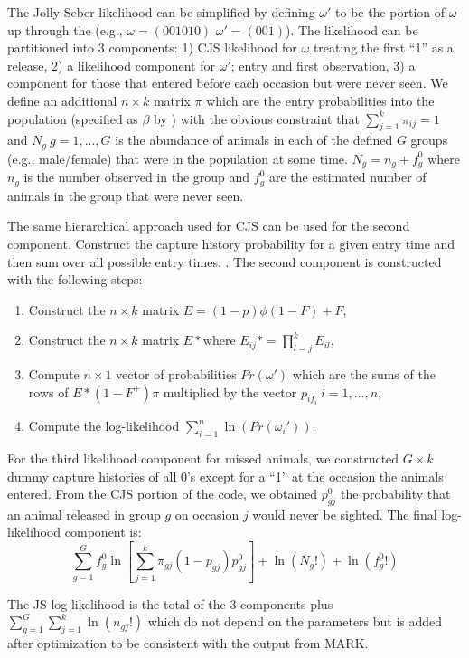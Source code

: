 \documentclass[12pt]{article}
\begin{document}
The Jolly-Seber likelihood can be simplified by defining $\omega'$
to be the portion of $\omega$ up through the (e.g., $\omega=(001010)$
$\omega'=(001)$). The likelihood can be partitioned into 3 components:
1) CJS likelihood for $\omega$ treating the first ``1'' as a release,
2) a likelihood component for $\omega'$; entry and first observation,
3) a component for those that entered before each occasion but were
never seen. We define an additional $n\times k$ matrix $\pi$ which
are the entry probabilities into the population (specified as $\beta$
by \citet{Schwarz1996}) with the obvious constraint that $\sum_{j=1}^{k}\pi_{ij}=1$
and $N_{g}\: g=1,...,G$ is the abundance of animals in each of the
defined $G$ groups (e.g., male/female) that were in the population
at some time. $N_{g}=n_{g}+f_{g}^{0}$ where $n_{g}$ is the number
observed in the group and $f_{g}^{0}$ are the estimated number of
animals in the group that were never seen.

The same hierarchical approach used for CJS can be used for the second
component. Construct the capture history probability for a given entry
time and then sum over all possible entry times. . The second component
is constructed with the following steps:
\begin{enumerate}
\item Construct the $n\times k$ matrix $E=(1-p)\phi(1-F)+F$,
\item Construct the $n\times k$ matrix $E*$where $E_{ij}*=\prod_{l=j}^{k}E_{il}$,
\item Compute $n\times1$ vector of probabilities $Pr(\omega')$ which are
the sums of the rows of $E*(1-F^{+})\pi$ multiplied by the vector
$p_{if_{i}}\: i=1,...,n$, 
\item Compute the log-likelihood $\sum_{i=1}^{n}\ln(Pr(\omega_{i}'))$.
\end{enumerate}
For the third likelihood component for missed animals, we constructed
$G\times k$ dummy capture histories of all 0's except for a ``1''
at the occasion the animals entered. From the CJS portion of the code,
we obtained $p_{gj}^{0}$ the probability that an animal released
in group $g$ on occasion $j$ would never be sighted. The final log-likelihood
component is:
\[
\sum_{g=1}^{G}f_{g}^{0}\ln\left[\sum_{j=1}^{k}\pi_{gj}(1-p_{gj})p_{gj}^{0}\right]+\ln(N_{g}!)+\ln(f_{g}^{0}!)
\]


The JS log-likelihood is the total of the 3 components plus $\sum_{g=1}^{G}\sum_{j=1}^{k}\ln(n_{gj}!)$
which do not depend on the parameters but is added after optimization
to be consistent with the output from MARK.
\end{document}
